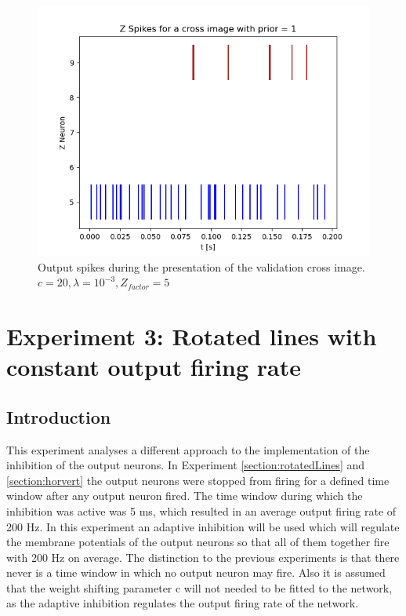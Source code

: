 \begin{figure}
  \includegraphics[width=\linewidth]{figures/horvert/horvert_c20_3_Zfactor5_crossZSpikes.png}
  \caption{Output spikes during the presentation of the validation cross image. $c = 20, \lambda = 10^{-3}, Z_{factor} = 5$}
  \label{fig:horvert_c20_3_Zfactor5_crossZSpikes}
\end{figure}



\section{Experiment 3: Rotated lines with constant output firing rate}

\subsection{Introduction}

This experiment analyses a different approach to the implementation of the inhibition of the output neurons. 
In Experiment \ref{section:rotatedLines} and \ref{section:horvert} the output neurons were stopped from firing for a defined time window after any output neuron fired. The time window during which the inhibition was active was 5 ms, which resulted in an average output firing rate of 200 Hz. In this experiment an adaptive inhibition will be used which will regulate the membrane potentials of the output neurons so that all of them together fire with 200 Hz on average. The distinction to the previous experiments is that there never is a time window in which no output neuron may fire. Also it is assumed that the weight shifting parameter c will not needed to be fitted to the network, as the adaptive inhibition regulates the output firing rate of the network.

